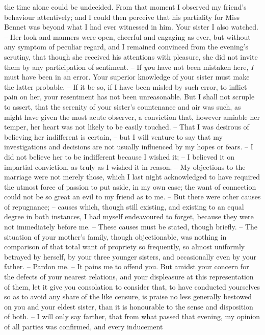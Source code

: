 \begin{letter}
the time alone could be undecided. From that moment
I observed my friend’s behaviour attentively; and I could
then perceive that his partiality for Miss Bennet was
beyond what I had ever witnessed in him. Your sister
I also watched. -- Her look and manners were open,
cheerful and engaging as ever, but without any symptom
of peculiar regard, and I remained convinced from the
evening’s scrutiny, that though she received his attentions
with pleasure, she did not invite them by any participation
of sentiment. -- If \textit{you} have not been mistaken here, \textit{I} must
have been in an error. Your superior knowledge of your
sister must make the latter probable. -- If it be so, if I have
been misled by such error, to inflict pain on her, your
resentment has not been unreasonable. But I shall not
scruple to assert, that the serenity of your sister’s countenance
and air was such, as might have given the most
acute observer, a conviction that, however amiable her
temper, her heart was not likely to be easily touched. -- That
I was desirous of believing her indifferent is certain, -- but
I will venture to say that my investigations and
decisions are not usually influenced by my hopes or fears.
-- I did not believe her to be indifferent because I wished it; --
I believed it on impartial conviction, as truly as I wished
it in reason. -- My objections to the marriage were not
merely those, which I last night acknowledged to have
required the utmost force of passion to put aside, in my
own case; the want of connection could not be so great
an evil to my friend as to me. -- But there were other
causes of repugnance; -- causes which, though still existing,
and existing to an equal degree in both instances, I had
myself endeavoured to forget, because they were not
immediately before me. -- These causes must be stated,
though briefly. -- The situation of your mother’s family,
though objectionable, was nothing in comparison of that
total want of propriety so frequently, so almost uniformly
betrayed by herself, by your three younger sisters, and
occasionally even by your father. -- Pardon me. -- It pains
me to offend you. But amidst your concern for the
defects of your nearest relations, and your displeasure at
this representation of them, let it give you consolation
to consider that, to have conducted yourselves so as to
avoid any share of the like censure, is praise no less
generally bestowed on you and your eldest sister, than it
is honourable to the sense and disposition of both. -- I will
only say farther, that from what passed that evening,
my opinion of all parties was confirmed, and every inducement

\end{letter}
